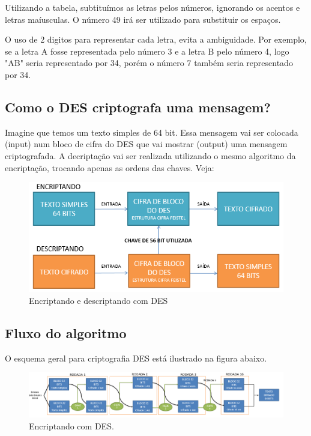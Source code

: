 \documentclass[
	article,			%
	12pt,				%
	oneside,			%
	a4paper,			%
	english,			%
	brazil,				%
	sumario=tradicional
	]{abntex2}
\begin{document}
Utilizando a tabela, subtituímos as letras pelos números, ignorando os acentos e letras maíusculas. O número 49 irá ser utilizado para substituir os espaços.

O uso de 2 digitos para representar cada letra, evita a ambiguidade. Por exemplo, se a letra A fosse representada pelo número 3 e a letra B pelo número 4, logo "AB" seria representado por 34, porém o número 7 também seria representado por 34.

\subsection{Como o DES criptografa uma mensagem?}

Imagine que temos um texto simples de 64 bit. Essa mensagem vai ser colocada (input) num bloco de cifra do DES que vai mostrar (output) uma mensagem criptografada. A decriptação vai ser realizada utilizando o mesmo algoritmo da encriptação, trocando apenas as ordens das chaves. Veja:\\

\begin{figure}[!htb]
	\centering
	\includegraphics{encriptando_descriptando}
	\caption{Encriptando e descriptando com DES}
	\label{encriptando_descriptando_des}
\end{figure}

\subsection{Fluxo do algoritmo}

O esquema geral para criptografia DES está ilustrado na figura abaixo.

\begin{figure}[!htb]
	\centering
	\includegraphics[scale=0.5]{esquema_geral}
	\caption{Encriptando com DES.}
	\label{esquema_geral_des}
\end{figure}
\end{document}
